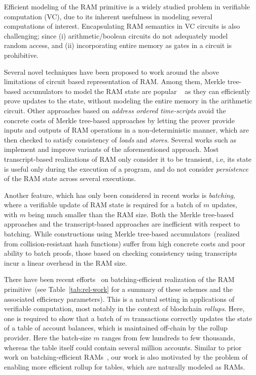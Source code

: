Efficient modeling of the RAM primitive is a widely studied problem in
verifiable computation (VC), due to its inherent usefulness in modeling several computations of interest.
Encapsulating RAM semantics in VC circuits is also challenging; since (i) arithmetic/boolean circuits do not
adequately model random access, and (ii) incorporating entire memory as gates in a circuit is prohibitive.

Several novel techniques have been proposed to work around the above limitations of circuit based representation
of RAM. Among them, Merkle tree-based accumulators to model the RAM state are popular
~\cite{EPRINT:BFRSBW13,compwithstate,C:BCTV14} as they can efficiently
prove updates to the state, without modeling the entire memory in the arithmetic circuit. Other
approaches based on {\em address ordered time-scripts} avoid the concrete costs of Merkle tree-based approaches
by letting the prover provide inputs and outputs of RAM operations in a non-deterministic manner, which
are then checked to satisfy consistency of {\em loads} and {\em stores}.
Several works such as \cite{NDSS:WSRBW15,USENIX:BCTV14,C:BCGTV13,SP:ZGKPP18} implement and improve variants
of the aforementioned approach. Most transcript-based realizations of RAM only consider it to be transient,
i.e, its state is useful only during the execution of a program, and do not consider {\em persistence} of the
RAM state across several executions. 

Another feature, which has only been considered in recent works
\cite{USENIX:OWWB20,CCS:CFHKKO22} is {\em batching}, where a verifiable update of RAM state is required
for a batch of $m$ updates, with $m$ being much smaller than the RAM size. Both the Merkle tree-based approaches
and the transcript-based approaches are inefficient with respect to batching.
While constructions using Merkle tree-based accumulators~(realized from collision-resistant hash functions) suffer from high concrete costs and poor
ability to batch proofs, those based on checking consistency using transcripts incur a linear overhead in the
RAM size.

\medskip

 There have been recent efforts~\cite{USENIX:OWWB20,CCS:CFHKKO22} on batching-efficient
realization of the RAM primitive~(see Table~\ref{tab:rel-work} for a summary of these schemes and the associated efficiency parameters). This is a natural setting in applications of verifiable
computation, most notably in the context of blockchain {\em rollups}. Here, one is required
to show that a batch of $m$ transactions correctly updates the state of a table of account balances, which
is maintained off-chain by the rollup provider. Here the batch-size $m$ ranges from few hundreds to few
thousands, whereas the table itself could contain several million accounts.
Similar to prior work on batching-efficient RAMs~\cite{USENIX:OWWB20,CCS:CFHKKO22}, our work is also motivated
 by the problem of enabling more efficient rollup for tables, which are
naturally modeled as RAMs.

